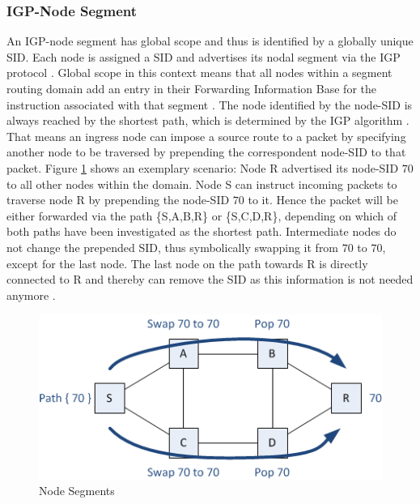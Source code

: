 \subsubsection{IGP-Node Segment}
\label{sec:nodal-segment}
An IGP-node segment has global scope and thus is identified by a globally unique SID. Each node is assigned a SID and advertises its nodal segment via the IGP protocol \cite{packet-pushers-sr-intro}. Global scope in this context means that all nodes within a segment routing domain add an entry in their Forwarding Information Base for the instruction associated with that segment \cite{cisco-whitepaper}. The node identified by the node-SID is always reached by the shortest path, which is determined by the IGP algorithm \cite{spring-sr-10}. That means an ingress node can impose a source route to a packet by specifying another node to be traversed by prepending the correspondent node-SID to that packet.
\newline
\newline
Figure \ref{fig:node-segment} shows an exemplary scenario: Node R advertised its node-SID $70$ to all other nodes within the domain. Node S can instruct incoming packets to traverse node R by prepending the node-SID $70$ to it. Hence the packet will be either forwarded via the path \{S,A,B,R\} or \{S,C,D,R\}, depending on which of both paths have been investigated as the shortest path. Intermediate nodes do not change the prepended SID, thus symbolically swapping it from $70$ to $70$, except for the last node. The last node on the path towards R is directly connected to R and thereby can remove the SID as this information is not needed anymore \cite{packet-pushers-sr-intro}.

\begin{figure}%
	\centering
	\includegraphics[width=0.95\linewidth]{figures/node-segment-2.png}
	\caption{Node Segments \cite{packet-pushers-sr-intro}}
	\label{fig:node-segment}
\end{figure}